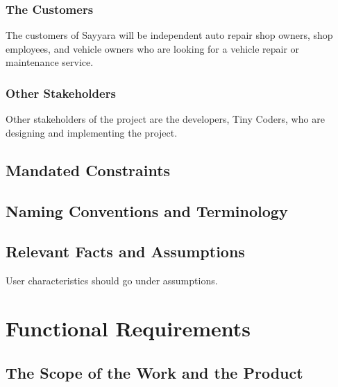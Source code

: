 \documentclass[12pt]{article}
\begin{document}
\subsubsection{The Customers}
The customers of Sayyara will be independent auto repair shop owners, shop employees, and vehicle
owners who are looking for a vehicle repair or maintenance service.

\subsubsection{Other Stakeholders}
Other stakeholders of the project are the developers, Tiny Coders, who are designing and
implementing the project.

\subsection{Mandated Constraints}

\subsection{Naming Conventions and Terminology}

\subsection{Relevant Facts and Assumptions}

User characteristics should go under assumptions.

\section{Functional Requirements}

\subsection{The Scope of the Work and the Product}
\end{document}
